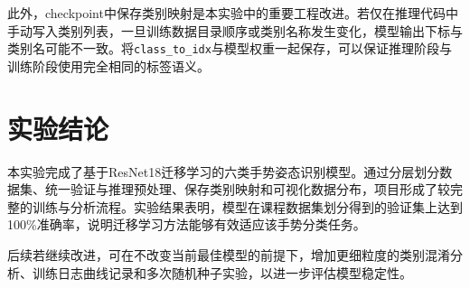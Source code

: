 \documentclass[11pt]{article}
\begin{document}
此外，checkpoint中保存类别映射是本实验中的重要工程改进。若仅在推理代码中手动写入类别列表，一旦训练数据目录顺序或类别名称发生变化，模型输出下标与类别名可能不一致。将\texttt{class\_to\_idx}与模型权重一起保存，可以保证推理阶段与训练阶段使用完全相同的标签语义。

\section{实验结论}
本实验完成了基于ResNet18迁移学习的六类手势姿态识别模型。通过分层划分数据集、统一验证与推理预处理、保存类别映射和可视化数据分布，项目形成了较完整的训练与分析流程。实验结果表明，模型在课程数据集划分得到的验证集上达到100\%准确率，说明迁移学习方法能够有效适应该手势分类任务。

后续若继续改进，可在不改变当前最佳模型的前提下，增加更细粒度的类别混淆分析、训练日志曲线记录和多次随机种子实验，以进一步评估模型稳定性。
\end{document}
